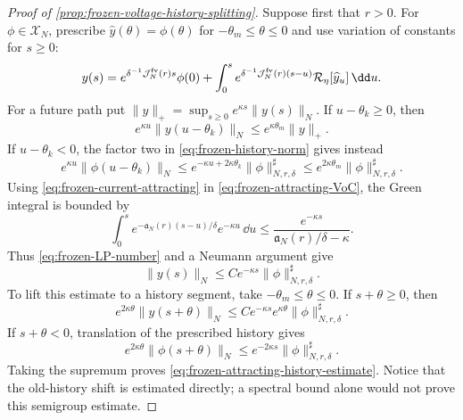 \begin{proof}[Proof of \cref{prop:frozen-voltage-history-splitting}]
Suppose first that \(r>0\).  For \(\phi\in\mathscr X_N\), prescribe
\(\widehat y(\theta)=\phi(\theta)\) for \(-\theta_m\le\theta\le0\) and use
variation of constants for \(s\ge0\):
\begin{equation}
 y(s)=e^{\delta^{-1}\mathcal J_N^{\rm fv}(r)s}\phi(0)
 +\int_0^s e^{\delta^{-1}\mathcal J_N^{\rm fv}(r)(s-u)}
       \mathcal R_\eta[\widehat y_u]\,\dd u.        \label{eq:frozen-attracting-VoC}
\end{equation}
For a future path put
\(\|y\|_+=\sup_{s\ge0}e^{\kappa s}\|y(s)\|_N\).
If \(u-\theta_k\ge0\), then
\begin{equation*}
 e^{\kappa u}\|y(u-\theta_k)\|_N
 \le e^{\kappa\theta_m}\|y\|_+.
\end{equation*}
If \(u-\theta_k<0\), the factor two in
\cref{eq:frozen-history-norm} gives instead
\begin{equation}
 e^{\kappa u}\|\phi(u-\theta_k)\|_N
 \le e^{-\kappa u+2\kappa\theta_k}
       \|\phi\|_{N,r,\delta}^{\sharp}
 \le e^{2\kappa\theta_m}
       \|\phi\|_{N,r,\delta}^{\sharp}.             \label{eq:frozen-old-history-bound}
\end{equation}
Using \cref{eq:frozen-current-attracting} in
\cref{eq:frozen-attracting-VoC}, the Green integral is bounded by
\begin{equation*}
 \int_0^s e^{-\mathfrak a_N(r)(s-u)/\delta}
              e^{-\kappa u}\,\dd u
 \le\frac{e^{-\kappa s}}
          {\mathfrak a_N(r)/\delta-\kappa}.
\end{equation*}
Thus \cref{eq:frozen-LP-number} and a Neumann argument give
\begin{equation}
 \|y(s)\|_N
 \le C e^{-\kappa s}\|\phi\|_{N,r,\delta}^{\sharp}.
                                                               \label{eq:frozen-attracting-current-decay}
\end{equation}
To lift this estimate to a history segment, take
\(-\theta_m\le\theta\le0\).  If \(s+\theta\ge0\), then
\begin{equation*}
 e^{2\kappa\theta}\|y(s+\theta)\|_N
 \le Ce^{-\kappa s}e^{\kappa\theta}
       \|\phi\|_{N,r,\delta}^{\sharp}.
\end{equation*}
If \(s+\theta<0\), translation of the prescribed history gives
\begin{equation*}
 e^{2\kappa\theta}\|\phi(s+\theta)\|_N
 \le e^{-2\kappa s}\|\phi\|_{N,r,\delta}^{\sharp}.
\end{equation*}
Taking the supremum proves
\cref{eq:frozen-attracting-history-estimate}.  Notice that the old-history
shift is estimated directly; a spectral bound alone would not prove this
semigroup estimate.


\end{proof}
